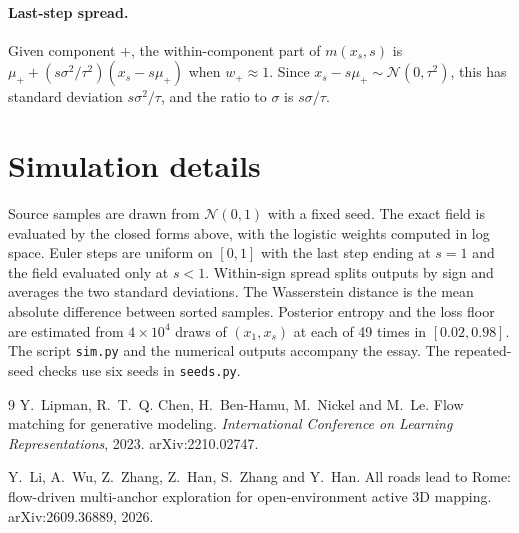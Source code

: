 \documentclass[11pt]{article}
\theoremstyle{definition}
\newcommand{\N}{\mathcal{N}}
\begin{document}
\paragraph{Last-step spread.} Given component $+$, the within-component part of $m(x_s,s)$ is $\mu_++(s\sigma^2/\tau^2)(x_s-s\mu_+)$ when $w_+\approx1$. Since $x_s-s\mu_+\sim\N(0,\tau^2)$, this has standard deviation $s\sigma^2/\tau$, and the ratio to $\sigma$ is $s\sigma/\tau$.

\section{Simulation details}

Source samples are drawn from $\N(0,1)$ with a fixed seed. The exact field is evaluated by the closed forms above, with the logistic weights computed in log space. Euler steps are uniform on $[0,1]$ with the last step ending at $s=1$ and the field evaluated only at $s<1$. Within-sign spread splits outputs by sign and averages the two standard deviations. The Wasserstein distance is the mean absolute difference between sorted samples. Posterior entropy and the loss floor are estimated from $4\times10^4$ draws of $(x_1,x_s)$ at each of 49 times in $[0.02,0.98]$. The script \texttt{sim.py} and the numerical outputs accompany the essay. The repeated-seed checks use six seeds in \texttt{seeds.py}.

\begin{thebibliography}{9}
Y.~Lipman, R.~T.~Q. Chen, H.~Ben-Hamu, M.~Nickel and M.~Le.
\newblock Flow matching for generative modeling.
\newblock \emph{International Conference on Learning Representations}, 2023. arXiv:2210.02747.

Y.~Li, A.~Wu, Z.~Zhang, Z.~Han, S.~Zhang and Y.~Han.
\newblock All roads lead to Rome: flow-driven multi-anchor exploration for open-environment active 3D mapping.
\newblock arXiv:2609.36889, 2026.
\end{thebibliography}
\end{document}
